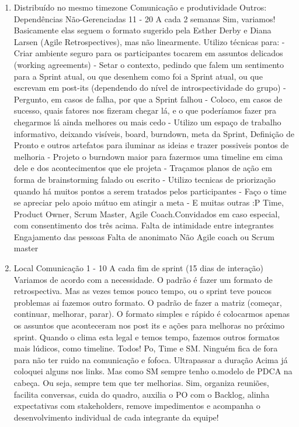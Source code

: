 \begin{enumerate}
	\item
	\begin{respostas2}
		{Distribuído no mesmo timezone}
		{Comunicação e produtividade \newline Outros: Dependências Não-Gerenciadas}
		{11 - 20}
		{A cada 2 semanas}
		{Sim, variamos! Basicamente elas seguem o formato sugerido pela Esther Derby e Diana Larsen (Agile Retrospectives), mas não linearmente. Utilizo técnicas para: - Criar ambiente seguro para os participantes tocarem em assuntos delicados (working agreements) - Setar o contexto, pedindo que falem um sentimento para a Sprint atual, ou que desenhem como foi a Sprint atual, ou que escrevam em post-its (dependendo do nível de introspectividade do grupo) - Pergunto, em casos de falha, por que a Sprint falhou - Coloco, em casos de sucesso, quais fatores nos fizeram chegar lá, e o que poderí­amos fazer pra chegarmos lá ainda melhores ou mais cedo - Utilizo um espaço de trabalho informativo, deixando visíveis, board, burndown, meta da Sprint, Definição de Pronto e outros artefatos para iluminar as ideias e trazer possiveis pontos de melhoria - Projeto o burndown maior para fazermos uma timeline em cima dele e dos acontecimentos que ele projeta - Traçamos planos de ação em forma de brainstorming falado ou escrito - Utilizo tecnicas de priorização quando há muitos pontos a serem tratados pelos participantes - Faço o time se apreciar pelo apoio mútuo em atingir a meta - E muitas outras :P}
		{Time, Product Owner, Scrum Master, Agile Coach.Convidados em caso especial, com consentimento dos três acima.}
		{Falta de intimidade entre integrantes \newline Engajamento das pessoas \newline Falta de anonimato}
		{Não}
		{Agile coach ou Scrum master}
	\end{respostas2}

	\item
	\begin{respostas2}
		{Local}
		{Comunicação}
		{1 - 10}
		{A cada fim de sprint (15 dias de interação)}
		{Variamos de acordo com a necessidade. O padrão é fazer um formato de retrospectiva. Mas as vezes temos pouco tempo, ou o sprint teve poucos problemas ai fazemos outro formato. O padrão de fazer a matriz (começar, continuar, melhorar, parar). O formato simples e rápido é colocarmos apenas os assuntos que aconteceram nos post its e ações para melhoras no próximo sprint. Quando o clima esta legal e temos tempo, fazemos outros formatos mais lúdicos, como timeline.}
		{Todos! Po, Time e SM. Ninguém fica de fora para não ter ruido na comunicação e fofoca.}
		{Ultrapassar a duração}
		{Acima já coloquei alguns nos links. Mas como SM sempre tenho o.modelo de PDCA na cabeça. Ou seja, sempre tem que ter melhorias.}
		{Sim, organiza reuniões, facilita conversas, cuida do quadro, auxilia o PO com o Backlog, alinha expectativas com stakeholders, remove impedimentos e acompanha o desenvolvimento individual de cada integrante da equipe!}
	\end{respostas2}


\end{enumerate}
